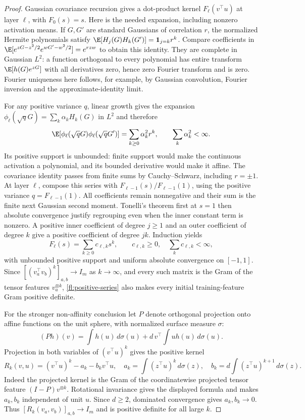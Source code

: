 \begin{proof}
Gaussian covariance recursion gives a dot-product kernel
$F_\ell(v^\top u)$ at layer $\ell$, with $F_0(s)=s$.
Here is the needed expansion, including nonzero activation means.
If $G,G'$ are standard Gaussians of correlation $r$, the normalized Hermite
polynomials satisfy
$\E[H_j(G)H_k(G')]=\mathbf1_{j=k}r^k$.
Compare coefficients in
$\E[e^{zG-z^2/2}e^{wG'-w^2/2}]=e^{rzw}$ to obtain this identity.
They are complete in Gaussian $L^2$: a function orthogonal to every
polynomial has entire transform $\E[h(G)e^{zG}]$ with all derivatives
zero, hence zero Fourier transform and is zero. Fourier uniqueness here
follows, for example, by Gaussian convolution, Fourier inversion and the
approximate-identity limit.

For any positive variance $q$, linear growth gives the expansion
$\phi_\ell(\sqrt qG)=\sum_k\alpha_kH_k(G)$ in $L^2$ and therefore
\[
 \E[\phi_\ell(\sqrt qG)\phi_\ell(\sqrt qG')]
 =\sum_{k\ge0}\alpha_k^2r^k,
 \qquad\sum_k\alpha_k^2<\infty.
\]
Its positive support is unbounded: finite support would make the continuous
activation a polynomial, and its bounded derivative would make it affine.
The covariance identity passes from finite sums by Cauchy--Schwarz,
including $r=\pm1$. At layer $\ell$, compose this series with
$F_{\ell-1}(s)/F_{\ell-1}(1)$, using the positive variance
$q=F_{\ell-1}(1)$. All coefficients remain nonnegative and their sum is
the finite next Gaussian second moment. Tonelli's theorem first at $s=1$
then absolute convergence justify regrouping even when the inner constant
term is nonzero. A positive inner coefficient of degree $j\ge1$ and an
outer coefficient of degree $k$ give a positive coefficient of degree $jk$.
Induction yields
\begin{equation}
 F_\ell(s)=\sum_{k\ge0}c_{\ell,k}s^k,
 \qquad c_{\ell,k}\ge0,\quad
 \sum_kc_{\ell,k}<\infty,
 \label{fl:positive-series}
\end{equation}
with unbounded positive support and uniform absolute convergence on
$[-1,1]$. Since $[(v_a^\top v_b)^k]_{a,b}\to I_m$ as $k\to\infty$,
and every such matrix is the Gram of the tensor features $v_a^{\otimes k}$,
\eqref{fl:positive-series} also makes every initial training-feature Gram
positive definite.

For the stronger non-affinity conclusion let $P$ denote orthogonal
projection onto affine functions on the unit sphere, with normalized
surface measure $\sigma$:
\[
 (Ph)(v)=\int h(u)\,d\sigma(u)
       +d\,v^\top\int u h(u)\,d\sigma(u).
\]
Projection in both variables of $(v^\top u)^k$ gives the positive kernel
\[
 R_k(v,u)=(v^\top u)^k-a_k-b_kv^\top u,
 \quad a_k=\int(z^\top u)^k\,d\sigma(z),\quad
 b_k=d\int(z^\top u)^{k+1}\,d\sigma(z).
\]
Indeed the projected kernel is the Gram of the coordinatewise projected
tensor feature $(I-P)v^{\otimes k}$. Rotational invariance gives the
displayed formula and makes $a_k,b_k$ independent of unit $u$.
Since $d\ge2$, dominated convergence gives $a_k,b_k\to0$. Thus
$[R_k(v_a,v_b)]_{a,b}\to I_m$ and is positive definite for all large $k$.


\end{proof}
